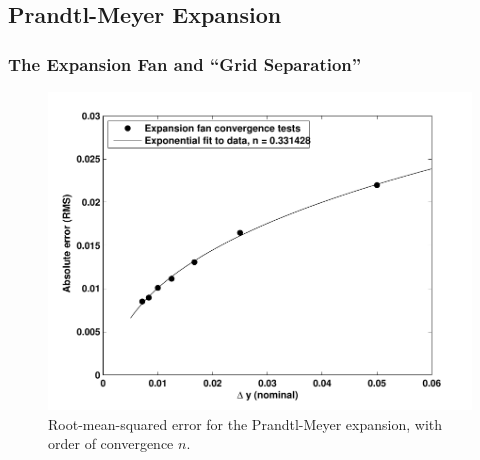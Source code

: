 \documentclass[12pt,letterpaper]{article}
\begin{document}

\subsection{Prandtl-Meyer Expansion}
\subsubsection{The Expansion Fan and ``Grid Separation''}

\begin{figure}[htbp]%
   \centering
   \includegraphics[width=\textwidth]{fan_convergence.pdf} 
   \caption[RMS error for Prandtl-Meyer expansion]{Root-mean-squared error for the Prandtl-Meyer expansion, with order of convergence $n$.}
   \label{fig:expansion_convergence}
\end{figure}
\end{document}
